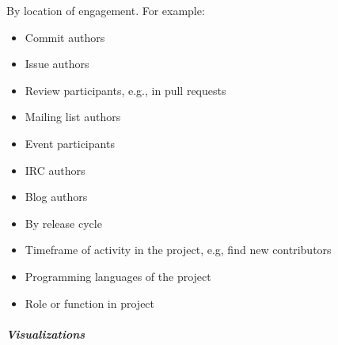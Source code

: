 By location of engagement. For example:

\begin{itemize}
\tightlist
\item
  Commit authors
\item
  Issue authors
\item
  Review participants, e.g., in pull requests
\item
  Mailing list authors
\item
  Event participants
\item
  IRC authors
\item
  Blog authors
\item
  By release cycle
\item
  Timeframe of activity in the project, e.g, find new contributors
\item
  Programming languages of the project
\item
  Role or function in project
\end{itemize}

\hypertarget{visualizations}{%
\subparagraph{Visualizations}\label{visualizations}}

